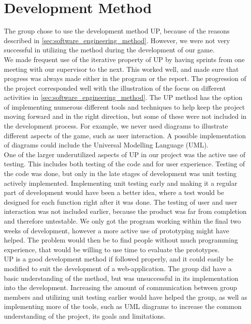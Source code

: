 \section{Development Method}
\label{sec:problems_with_UP}

The group chose to use the development method UP, because of the reasons described in \autoref{sec:software_engineering_method}. However, we were not very successful in utilizing the method during the development of our game.\\

We made frequent use of the iterative property of UP by having sprints from one meeting with our supervisor to the next. This worked well, and made sure that progress was always made either in the program or the report. The progression of the project corresponded well with the illustration of the focus on different activities in \autoref{sec:software_engineering_method}. The UP method has the option of implementing numerous different tools and techniques to help keep the project moving forward and in the right direction, but some of these were not included in the development process. For example, we never used diagrams to illustrate different aspects of the game, such as user interaction. A possible implementation of diagrams could include the Universal Modelling Language (UML).\\

One of the larger underutilized aspects of UP in our project was the active use of testing. This includes both testing of the code and for user experience. Testing of the code was done, but only in the late stages of development was unit testing actively implemented. Implementing unit testing early and making it a regular part of development would have been a better idea, where a test would be designed for each function right after it was done. The testing of user and user interaction was not included earlier, because the product was far from completion and therefore untestable. We only got the program working within the final two weeks of development, however a more active use of prototyping might have helped. The problem would then be to find people without much programming experience, that would be willing to use time to evaluate the prototypes.\\

UP is a good development method if followed properly, and it could easily be modified to suit the development of a web-application. The group did have a basic understanding of the method, but was unsuccessful in its implementation into the development. Increasing the amount of communication between group members and utilizing unit testing earlier would have helped the group, as well as implementing more of the tools, such as UML diagrams to increase the common understanding of the project, its goals and limitations.


